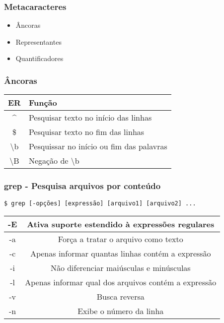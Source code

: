 \documentclass{beamer}
\begin{document}
   \begin{frame}
      \frametitle{Metacaracteres}
      \begin{itemize}
         \item Âncoras
	 \item Representantes
	 \item Quantificadores
      \end{itemize}
   \end{frame}

   \begin{frame}
      \frametitle{Âncoras}
      \begin{table}
         \begin{tabular}{ c | l }
         \textbf{ER} & \textbf{Função}  \\
         \hline 
         \^{} & Pesquisar texto no início das linhas \\
         \hline
         \$ & Pesquisar texto no fim das linhas  \\
         \hline
         \textbackslash b & Pesquissar no início ou fim das palavras  \\
         \hline
         \textbackslash B & Negação de \textbackslash b  \\
         \hline
         \end{tabular}
      \end{table}
   \end{frame}

\begin{frame}[fragile]
   \frametitle{grep - Pesquisa arquivos por conteúdo}
   \begin{verbatim}
$ grep [-opções] [expressão] [arquivo1] [arquivo2] ...
   \end{verbatim}
   \begin{table}
      \begin{tabular}{ c | c }
         \textbf{-E} & \textbf{Ativa suporte estendido à expressões regulares} \\ 
	 \hline
	 -a & Força a tratar o arquivo como texto \\
	 \hline
         -c & Apenas informar quantas linhas contém a expressão \\
         \hline 
         -i & Não diferenciar maiúsculas e minúsculas \\
         \hline
         -l & Apenas informar qual dos arquivos contém a expressão \\
         \hline
         -v & Busca reversa \\
         \hline
         -n & Exibe o número da linha \\
         \hline
      \end{tabular}
   \end{table}
\end{frame}
\end{document}
